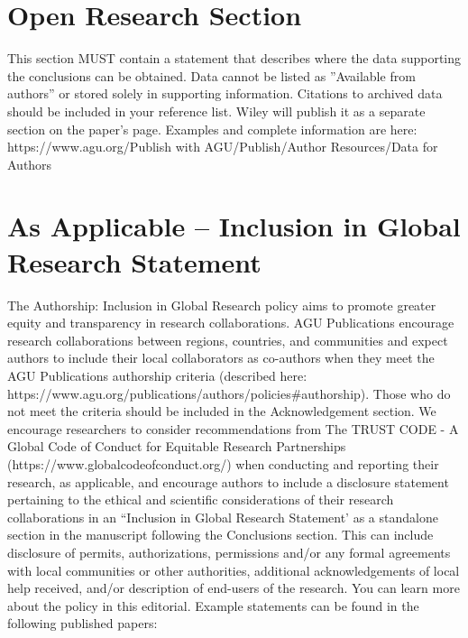 \documentclass[draft]{agujournal2019}
\begin{document}
%
%

\section*{Open Research Section}
This section MUST contain a statement that describes where the data supporting the conclusions can be obtained. Data cannot be listed as ''Available from authors'' or stored solely in supporting information. Citations to archived data should be included in your reference list. Wiley will publish it as a separate section on the paper’s page. Examples and complete information are here:
https://www.agu.org/Publish with AGU/Publish/Author Resources/Data for Authors

\section*{As Applicable – Inclusion in Global Research Statement}
The Authorship: Inclusion in Global Research policy aims to promote greater equity and transparency in research collaborations. AGU Publications encourage research collaborations between regions, countries, and communities and expect authors to include their local collaborators as co-authors when they meet the AGU Publications authorship criteria (described here: https://www.agu.org/publications/authors/policies\#authorship). Those who do not meet the criteria should be included in the Acknowledgement section. We encourage researchers to consider recommendations from The TRUST CODE - A Global Code of Conduct for Equitable Research Partnerships (https://www.globalcodeofconduct.org/) when conducting and reporting their research, as applicable, and encourage authors to include a disclosure statement pertaining to the ethical and scientific considerations of their research collaborations in an “Inclusion in Global Research Statement’ as a standalone section in the manuscript following the Conclusions section. This can include disclosure of permits, authorizations, permissions and/or any formal agreements with local communities or other authorities, additional acknowledgements of local help received, and/or description of end-users of the research. You can learn more about the policy in this editorial. Example statements can be found in the following published papers: 
\end{document}
